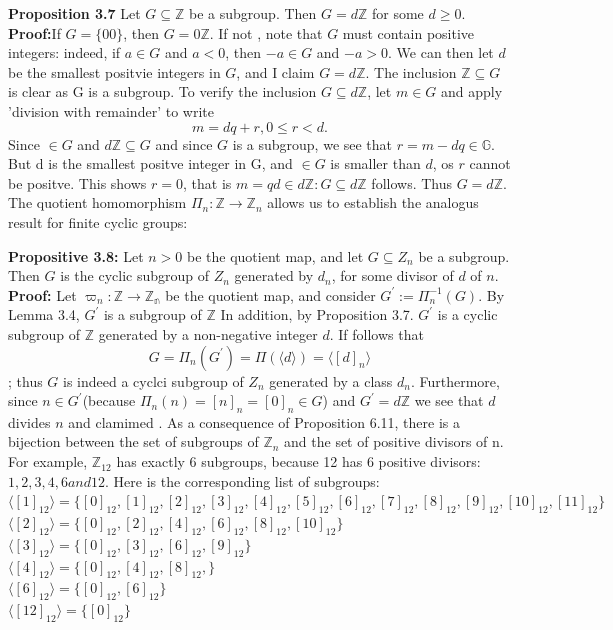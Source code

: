\textbf{Proposition 3.7} Let $G \subseteq \mathbb{Z}$ be a subgroup. Then $G = d\mathbb{Z}$ for some $d \ge 0$.
\textbf{Proof:}If $G = \{00\}$, then $G = 0\mathbb{Z}$. If not , note that $G$ must contain positive integers: indeed, if $a \in G$ and $a < 0$, then $-a \in G$ and $-a > 0$. We can then let $d$ be the smallest positvie integers in $G$, and I claim $G = d\mathbb{Z}$. The inclusion $\mathbb{Z}\subseteq G$ is clear as G is a subgroup. To verify the inclusion $G \subseteq d\mathbb{Z}$, let $m\in G$ and apply 'division with remainder' to write $$m = dq + r , 0 \le r < d.$$
Since $\in G$ and $d\mathbb{Z}\subseteq G$ and since $G$ is a subgroup, we see that $r = m - dq \in \mathbb{G}$. But d is the smallest positve integer in G, and $\in G$ is smaller than $d$, os $r$ cannot be positve. This shows $r = 0$, that is $m = qd \in d\mathbb{Z} : G\subseteq d\mathbb{Z}$ follows. Thus $G = d\mathbb{Z}$.
The quotient homomorphism $\varPi_n : \mathbb{Z} \to \mathbb{Z}_n$ allows us to establish the analogus result for finite cyclic groups:

\textbf{Propositive 3.8:}
 Let $ n>0 $ be the quotient map, and let $G \subseteq Z_n$ be a subgroup. Then $G$ is the cyclic subgroup of $Z_n$ generated by $d_n$, for some divisor of $d$ of $n$.
\textbf{Proof:}
Let $ \varpi_n: \mathbb{Z} \to \mathbb{Z_n}$ be the quotient map, and consider $G^\prime := \varPi_n^{-1}(G)$.
 By Lemma 3.4, $G^\prime$ is a subgroup of $\mathbb{Z}$ In addition, by Proposition 3.7. $G^\prime$ is a cyclic subgroup of $\mathbb{Z}$
 generated by a non-negative integer $d$. If follows that
 $$ G = \varPi_n(G^\prime) = \varPi(\langle d \rangle) = \langle [d]_n \rangle$$;
thus $G$ is indeed a cyclci subgroup of $Z_n$ generated by a class $d_n$. Furthermore,
since $n \in G^\prime$(because $\varPi_n(n) = [n]_n = [0]_n \in G$) and $G^\prime = d\mathbb{Z}$
we see that $d$ divides $n$ and clamimed . As a consequence of Proposition 6.11, there is a bijection between
the set of subgroups of $\mathbb{Z}_n$ and the set of positive divisors of n.
For example, $\mathbb{Z}_12$ has exactly 6 subgroups, because 12 has 6 positive divisors: $1,2,3,4,6 and 12.$
 Here is the corresponding list of subgroups: \\
$\langle [1]_12\rangle = \{[0]_{12}, [1]_{12}, [2]_{12}, [3]_{12}, [4]_{12}, [5]_{12},[6]_{12} ,[7]_{12},[8]_{12}, [9]_{12}, [10]_{12}, [11]_{12}\}$ \\
$\langle [2]_12\rangle = \{[0]_{12}, [2]_{12},[4]_{12},[6]_{12} ,[8]_{12}, [10]_{12}\}$ \\
$\langle [3]_12\rangle = \{[0]_{12}, [3]_{12}, [6]_{12}, [9]_{12}\}$ \\
$\langle [4]_12\rangle = \{[0]_{12}, [4]_{12}, [8]_{12},\}$ \\
$\langle [6]_12\rangle = \{[0]_{12}, [6]_{12}\}$ \\
$\langle [12]_12\rangle = \{[0]_{12}\}$ \\

